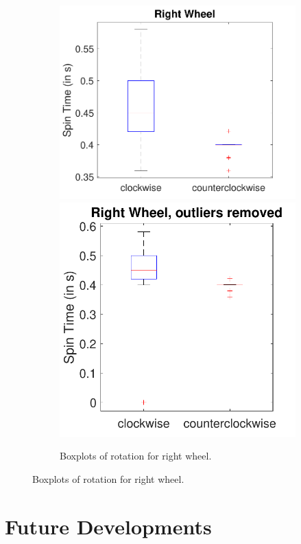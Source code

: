 \documentclass[a4paper,twoside]{book}
\begin{document}
\begin{figure}[h]
\begin{subfigure}[t]{0.5\textwidth}
  \includegraphics[width=\textwidth, center]{img/right} 
  \includegraphics[width=\textwidth, center]{img/right_2}
  \caption{Boxplots of rotation for right wheel.}
  \end{subfigure}
\end{figure}


\chapter{Future Developments}
\end{document}
